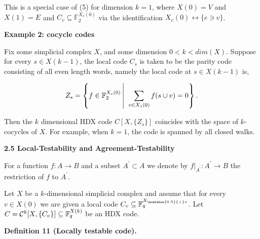 \documentclass[10pt,a4paper]{article}
\begin{document}
This is a special case of (5) for dimension $k=1$, where $X(0)=V$ and $X(1)=E$ and $C_{v}\subseteq\mathbb{F}_{2}^{X_{v}(0)}$ via the identification $X_{v}(0)\leftrightarrow\{e\ni v\}$.\par





\par\medskip\noindent\textbf{Example 2: cocycle codes}\par




Fix some simplicial complex $X$, and some dimension $0<k<dim(X)$. Suppose for every $s\in X(k-1)$, the local code $C_{s}$ is taken to be the parity code consisting of all even length words, namely the local code at $s\in X(k-1)$ is,\par


\[\begin{gathered}
Z_{s}=\left\{f\in\mathbb{F}_{2}^{X_{s}(0)}\left|\;\vphantom{f\in\mathbb{F}_{2}^{X_{s}(0)}\sum_{v\in X_{s}(0)}f(s\cup v)=0}\right.\sum_{v\in X_{s}(0)}f(s\cup
v)=0\right\}.
\end{gathered}\]


Then the $k$ dimensional HDX code $C[X,\{Z_{s}\}]$ coincides with the space of $k$-cocycles of $X$. For example, when $k=1$, the code is spanned by all closed walks.\par






\par\medskip\noindent\textbf{
2.5 Local-Testability and Agreement-Testability}\par




For a function $f:A\to B$ and a subset $A^{\prime}\subset A$ we denote by $f|_{A^{\prime}}:A^{\prime}\to B$ the restriction of $f$ to $A^{\prime}$.\par




Let $X$ be a $k$-dimensional simplicial complex and assume that for every $v\in X(0)$ we are given a local code $C_{v}\subseteq\mathbb{F}_{q}^{{X}_{\scalebox{0.5}{+}v}}$. Let $C={\cal C}^{k}[X,\{C_{v}\}]\subseteq\mathbb{F}_{q}^{X(k)}$ be an HDX code.\par





\par\medskip\noindent\textbf{
\textbf{Definition 11}\textbf{ }(Locally testable code)\textbf{.}
}\par
\end{document}
